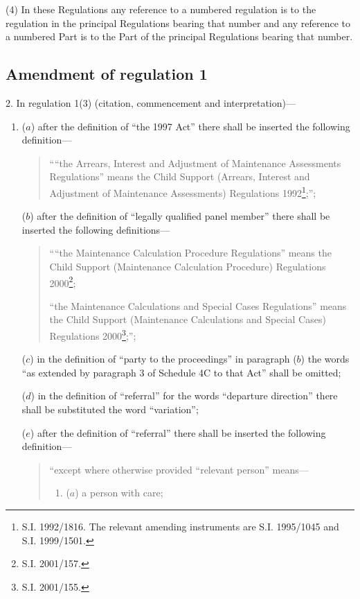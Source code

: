 \documentclass[12pt,a4paper]{article}
\begin{document}
(4) In these Regulations any reference to a numbered regulation is to the regulation in the principal Regulations bearing that number and any reference to a numbered Part is to the Part of the principal Regulations bearing that number.

\subsection[2. Amendment of regulation 1]{Amendment of regulation 1}

2.  In regulation 1(3) (citation, commencement and interpretation)—
\begin{enumerate}\item[]
($a$) after the definition of “the 1997 Act” there shall be inserted the following definition—
\begin{quotation}
““the Arrears, Interest and Adjustment of Maintenance Assessments Regulations” means the Child Support (Arrears, Interest and Adjustment of Maintenance Assessments) Regulations 1992\footnote{\frenchspacing S.I. 1992/1816. The relevant amending instruments are S.I. 1995/1045 and S.I. 1999/1501.};”;
\end{quotation}

($b$) after the definition of “legally qualified panel member” there shall be inserted the following definitions—
\begin{quotation}
““the Maintenance Calculation Procedure Regulations” means the Child Support (Maintenance Calculation Procedure) Regulations 2000\footnote{\frenchspacing S.I. 2001/157.};

“the Maintenance Calculations and Special Cases Regulations” means the Child Support (Maintenance Calculations and Special Cases) Regulations 2000\footnote{\frenchspacing S.I. 2001/155.};”;
\end{quotation}

($c$) in the definition of “party to the proceedings” in paragraph ($b$)  the words “as extended by paragraph 3 of Schedule 4C to that Act” shall be omitted;

($d$) in the definition of “referral” for the words “departure direction” there shall be substituted the word “variation”;

($e$) after the definition of “referral” there shall be inserted the following definition—
\begin{quotation}
    “except where otherwise provided “relevant person” means—
\begin{enumerate}\item[]
    ($a$) 
    a person with care;


\end{enumerate}
\end{quotation}
\end{enumerate}
\end{document}
